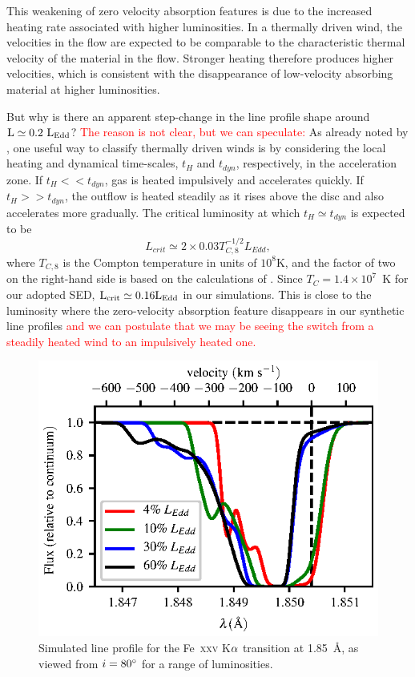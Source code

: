 \documentclass[a4paper,fleqn,usenatbib]{mnras}
\begin{document}
This weakening of zero velocity absorption features is due to the
increased heating rate associated with higher
luminosities. In a thermally driven wind, the velocities in the flow are
expected to be comparable to the characteristic thermal velocity of 
the material in the flow. Stronger heating therefore
produces higher velocities, which is consistent with the disappearance
of low-velocity absorbing material at higher luminosities.

But why is there an apparent step-change in the line profile shape
around $\rm{L \simeq 0.2~L_{Edd}}$? \textcolor{red}{The reason is
not clear, but we can speculate:} As already noted by
\cite{1983ApJ...271...70B}, one useful way to classify thermally
driven winds is by considering the local heating and dynamical 
time-scales, $t_H$ and $t_{dyn}$, respectively, in the acceleration
zone. If $t_H << t_{dyn}$, gas is heated impulsively and accelerates
quickly. If $t_H >> t_{dyn}$, the outflow is heated steadily as it
rises above the disc and also accelerates more gradually. The critical
luminosity at which $t_H \simeq t_{dyn}$ is expected to be 
\begin{equation}
L_{crit} \simeq 2\times 0.03 T_{C,8}^{-1/2}L_{Edd},
\end{equation}
where $T_{C,8}$ is the Compton temperature in units of $10^8$K,
and the factor of two on the right-hand side is based on the
calculations of  \cite[hereafter W96]{1996ApJ...461..767W}. Since $T_C=1.4\times10^7$~K
for our adopted SED, $\rm{L_{crit} \simeq 0.16 L_{Edd}}$ in our
simulations. This is close to the luminosity where the zero-velocity
absorption feature disappears in our synthetic line profiles \textcolor{
red}{and we can postulate that we may be seeing the switch
from a steadily heated wind to an impulsively heated one.}

\begin{figure}
\includegraphics[width=\columnwidth]{figures/fig5_80_degrees_fe25.eps}
\caption{Simulated line profile for the Fe~\textsc{xxv} K$\rm{\alpha}$
transition at 1.85~{\AA}, as viewed from $i = 80\degree$ for a range
of luminosities.}
\label{figure:line25}
\end{figure}
\end{document}
